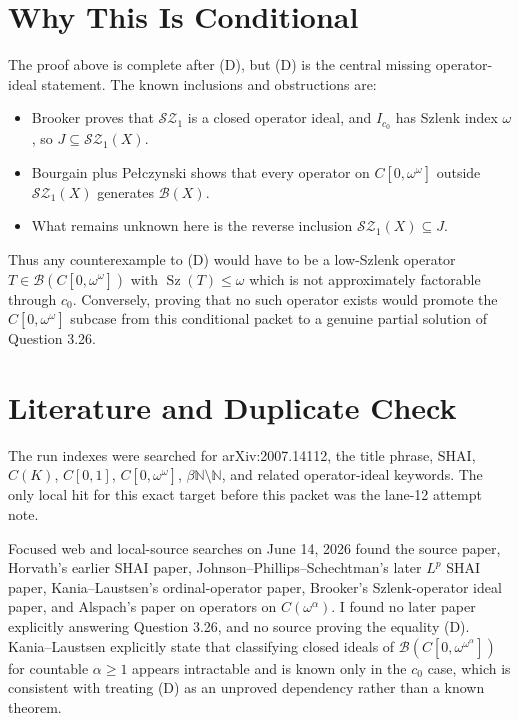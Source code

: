 \documentclass[11pt]{article}
\newcommand{\B}{\mathscr{B}}
\newcommand{\SZ}{\mathscr{S\!Z}}
\newcommand{\Sz}{\operatorname{Sz}}
\begin{document}
\section*{Why This Is Conditional}

The proof above is complete after (D), but (D) is the central missing
operator-ideal statement.  The known inclusions and obstructions are:
\begin{itemize}[leftmargin=2em]
\item Brooker proves that \(\SZ_1\) is a closed operator ideal, and
\(I_{c_0}\) has Szlenk index \(\omega\), so \(J\subseteq \SZ_1(X)\).
\item Bourgain plus Pe\l{}czynski shows that every operator on
\(C[0,\omega^\omega]\) outside \(\SZ_1(X)\) generates \(\B(X)\).
\item What remains unknown here is the reverse inclusion
\(\SZ_1(X)\subseteq J\).
\end{itemize}

Thus any counterexample to (D) would have to be a low-Szlenk operator
\(T\in\B(C[0,\omega^\omega])\) with \(\Sz(T)\leq\omega\) which is not
approximately factorable through \(c_0\).  Conversely, proving that no such
operator exists would promote the \(C[0,\omega^\omega]\) subcase from this
conditional packet to a genuine partial solution of Question 3.26.

\section*{Literature and Duplicate Check}

The run indexes were searched for arXiv:2007.14112, the title phrase,
\(\mathrm{SHAI}\), \(C(K)\), \(C[0,1]\), \(C[0,\omega^\omega]\),
\(\beta\mathbb N\setminus\mathbb N\), and related operator-ideal keywords.
The only local hit for this exact target before this packet was the lane-12
attempt note.

Focused web and local-source searches on June 14, 2026 found the source
paper, Horvath's earlier SHAI paper, Johnson--Phillips--Schechtman's later
\(L^p\) SHAI paper, Kania--Laustsen's ordinal-operator paper, Brooker's
Szlenk-operator ideal paper, and Alspach's paper on operators on
\(C(\omega^\alpha)\).  I found no later paper explicitly answering Question
3.26, and no source proving the equality (D).  Kania--Laustsen explicitly
state that classifying closed ideals of
\(\B(C[0,\omega^{\omega^\alpha}])\) for countable \(\alpha\geq1\) appears
intractable and is known only in the \(c_0\) case, which is consistent with
treating (D) as an unproved dependency rather than a known theorem.
\end{document}
